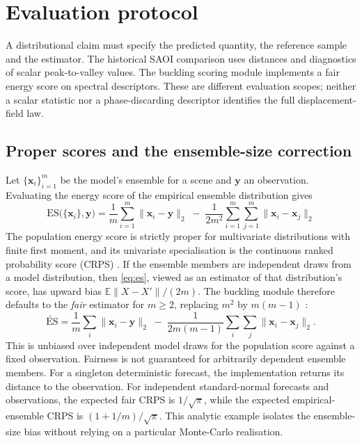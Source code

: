 
\section{Evaluation protocol}
\label{sec:protocol}

A distributional claim must specify the predicted quantity, the reference
sample and the estimator. The historical SAOI comparison uses distances and
diagnostics of scalar peak-to-valley values. The buckling scoring module
implements a fair energy score on spectral descriptors. These are different
evaluation scopes; neither a scalar statistic nor a phase-discarding descriptor
identifies the full displacement-field law.

\subsection{Proper scores and the ensemble-size correction}
\label{sec:protocol:proper}

Let $\{\mathbf{x}_i\}_{i=1}^{m}$ be the model's ensemble for a scene and
$\mathbf{y}$ an observation. Evaluating the energy score of the empirical
ensemble distribution gives
\begin{equation}
  \mathrm{ES}\bigl(\{\mathbf{x}_i\},\mathbf{y}\bigr)
  = \frac{1}{m}\sum_{i=1}^{m}\bigl\|\mathbf{x}_i-\mathbf{y}\bigr\|_2
  \;-\;\frac{1}{2m^2}\sum_{i=1}^{m}\sum_{j=1}^{m}
       \bigl\|\mathbf{x}_i-\mathbf{x}_j\bigr\|_2
  \label{eq:es}
\end{equation}
The population energy score is strictly proper for multivariate distributions
with finite first moment, and its univariate specialisation is the continuous
ranked probability score (CRPS) \citep{gneiting2007strictly}. If the ensemble
members are independent draws from a model distribution, then
\eqref{eq:es}, viewed as an estimator of that distribution's score, has
upward bias $\mathbb{E}\|X-X'\|/(2m)$. The buckling module therefore defaults
to the \emph{fair} estimator for $m\geq2$, replacing $m^2$ by $m(m-1)$
\citep{ferro2014fair}:
\begin{equation}
  \widetilde{\mathrm{ES}}
  = \frac{1}{m}\sum_{i}\bigl\|\mathbf{x}_i-\mathbf{y}\bigr\|_2
  \;-\;\frac{1}{2m(m-1)}\sum_{i}\sum_{j}\bigl\|\mathbf{x}_i-\mathbf{x}_j\bigr\|_2 .
  \label{eq:fair-es}
\end{equation}
This is unbiased over independent model draws for the population score
against a fixed observation. Fairness is not guaranteed for arbitrarily
dependent ensemble members. For a singleton deterministic forecast, the
implementation returns its distance to the observation. For independent
standard-normal forecasts and observations, the expected fair CRPS is
$1/\sqrt{\pi}$, while the expected empirical-ensemble CRPS is
$(1+1/m)/\sqrt{\pi}$. This analytic example isolates the ensemble-size bias
without relying on a particular Monte-Carlo realisation.

